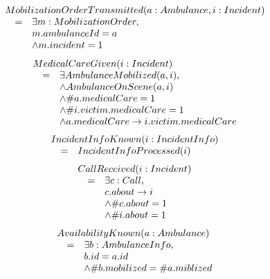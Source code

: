 \begin{equation*}
\begin{array}{rcl}
\multicolumn{3}{l}{MobilizationOrderTransmitted(a: Ambulance, i:Incident)} \\ 
& = & \exists m: MobilizationOrder, \\
&   & m.ambulanceId = a \\
&   & \wedge m.incident = 1 \\
\end{array}
\end{equation*}
\begin{equation*}
\begin{array}{rcl}
\multicolumn{3}{l}{MedicalCareGiven(i:Incident)} \\ 
& = & \exists AmbulanceMobilized(a, i), \\
&   & \wedge AmbulanceOnScene(a, i) \\
&   & \wedge \#a.medicalCare = 1 \\
&   & \wedge \#i.victim.medicalCare = 1 \\
&   & \wedge a.medicalCare \rightarrow i.victim.medicalCare \\ 
\end{array}
\end{equation*}
\begin{equation*}
\begin{array}{rcl}
\multicolumn{3}{l}{IncidentInfoKnown(i:IncidentInfo)} \\ 
& = & IncidentInfoProcessed(i) \\
\end{array}
\end{equation*}
\begin{equation*}
\begin{array}{rcl}
\multicolumn{3}{l}{CallReceived(i:Incident)} \\ 
& = & \exists c: Call, \\
&   & c.about \rightarrow i \\
&   & \wedge \#c.about = 1 \\
&   & \wedge \#i.about = 1 \\
\end{array}
\end{equation*}
\begin{equation*}
\begin{array}{rcl}
\multicolumn{3}{l}{AvailabilityKnown(a: Ambulance)} \\
& = & \exists b: AmbulanceInfo, \\
&   & b.id = a.id \\
&   & \wedge \#b.mobilized = \#a.miblized \\
\end{array}
\end{equation*}
